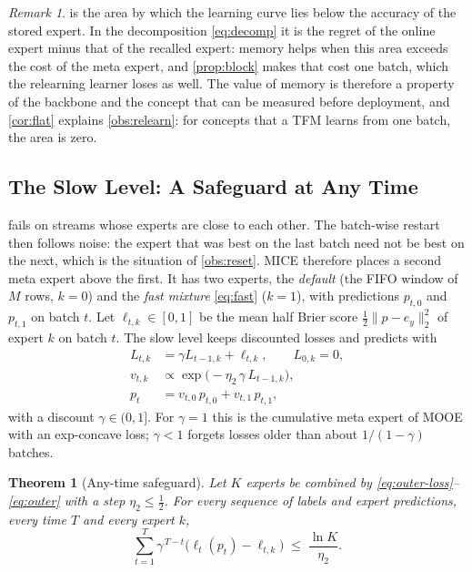 \documentclass[11pt]{article}
\theoremstyle{plain}
\newtheorem{theorem}{Theorem}
\theoremstyle{definition}
\theoremstyle{remark}
\newtheorem{remark}{Remark}
\newcommand{\method}{\textsc{MICE}}   %
\begin{document}
\begin{remark}
 is the area by which the learning curve lies below the accuracy of the stored expert. In the
decomposition \eqref{eq:decomp} it is the regret of the online expert minus that of the recalled expert: memory helps
when this area exceeds the cost of the meta expert, and \cref{prop:block} makes that cost one batch, which the
relearning learner loses as well. The value of memory is therefore a property of the backbone and the concept that
can be measured before deployment, and \cref{cor:flat} explains \cref{obs:relearn}: for concepts that a TFM learns
from one batch, the area is zero.
\end{remark}

\subsection{The Slow Level: A Safeguard at Any Time}
\label{sec:th-slow}

 fails on streams whose experts are close to each other. The batch-wise restart then follows
noise: the expert that was best on the last batch need not be best on the next, which is the situation of
\cref{obs:reset}. \method{} therefore places a second meta expert above the first. It has two experts, the
\emph{default} (the FIFO window of $M$ rows, $k=0$) and the \emph{fast mixture} \eqref{eq:fast} ($k=1$), with
predictions $p_{t,0}$ and $p_{t,1}$ on batch $t$. Let $\ell_{t,k}\in[0,1]$ be the mean half Brier score
$\tfrac12\lVert p-e_y\rVert_2^2$ of expert $k$ on batch $t$. The slow level keeps discounted losses and predicts with
\begin{align}
  L_{t,k}&=\gamma L_{t-1,k}+\ell_{t,k},\qquad L_{0,k}=0, \label{eq:outer-loss}\\
  v_{t,k}&\propto\exp\bigl(-\eta_2\,\gamma\,L_{t-1,k}\bigr), \label{eq:outer-weight}\\
  p_t&=v_{t,0}\,p_{t,0}+v_{t,1}\,p_{t,1}, \label{eq:outer}
\end{align}
with a discount $\gamma\in(0,1]$. For $\gamma=1$ this is the cumulative meta expert of MOOE with an exp-concave loss;
$\gamma<1$ forgets losses older than about $1/(1-\gamma)$ batches.

\begin{theorem}[Any-time safeguard]\label{prop:outer}
Let $K$ experts be combined by \eqref{eq:outer-loss}--\eqref{eq:outer} with a step $\eta_2\le\tfrac12$. For every
sequence of labels and expert predictions, every time $T$ and every expert $k$,
\begin{equation}\label{eq:outer-bound}
  \sum_{t=1}^{T}\gamma^{\,T-t}\bigl(\ell_t(p_t)-\ell_{t,k}\bigr)\;\le\;\frac{\ln K}{\eta_2} .
\end{equation}
\end{theorem}
\end{document}
